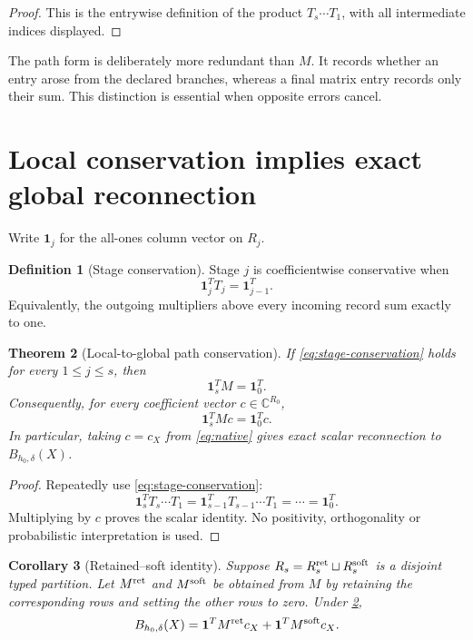 \documentclass[11pt]{article}
\newtheorem{theorem}{Theorem}[section]
\newtheorem{corollary}[theorem]{Corollary}
\theoremstyle{definition}
\newtheorem{definition}[theorem]{Definition}
\theoremstyle{remark}
\newcommand{\C}{\mathbb C}
\newcommand{\one}{\mathbf 1}
\begin{document}
\begin{proof}
This is the entrywise definition of the product
\(T_s\cdots T_1\), with all intermediate indices displayed.
\end{proof}

The path form is deliberately more redundant than \(M\).  It
records whether an entry arose from the declared branches, whereas a
final matrix entry records only their sum.  This distinction is
essential when opposite errors cancel.

\section{Local conservation implies exact global reconnection}

Write \(\one_j\) for the all-ones column vector on \(R_j\).

\begin{definition}[Stage conservation]
Stage \(j\) is coefficientwise conservative when
\begin{equation}
 \one_j^TT_j=\one_{j-1}^T.
 \label{eq:stage-conservation}
\end{equation}
Equivalently, the outgoing multipliers above every incoming record
sum exactly to one.
\end{definition}

\begin{theorem}[Local-to-global path conservation]
\label{thm:local-global}
If \eqref{eq:stage-conservation} holds for every
\(1\le j\le s\), then
\[
 \boxed{\one_s^TM=\one_0^T.}
\]
Consequently, for every coefficient vector \(c\in\C^{R_0}\),
\[
 \one_s^TMc=\one_0^Tc.
\]
In particular, taking \(c=c_X\) from \eqref{eq:native} gives exact
scalar reconnection to \(B_{h_0,\delta}(X)\).
\end{theorem}

\begin{proof}
Repeatedly use \eqref{eq:stage-conservation}:
\[
 \one_s^TT_s\cdots T_1
 =
 \one_{s-1}^TT_{s-1}\cdots T_1
 =\cdots=\one_0^T.
\]
Multiplying by \(c\) proves the scalar identity.  No positivity,
orthogonality or probabilistic interpretation is used.
\end{proof}

\begin{corollary}[Retained--soft identity]
\label{cor:retsoft}
Suppose \(R_s=R_s^{\rm ret}\sqcup R_s^{\rm soft}\) is a disjoint
typed partition.  Let \(M^{\rm ret}\) and \(M^{\rm soft}\) be obtained
from \(M\) by retaining the corresponding rows and setting the other
rows to zero.  Under \cref{thm:local-global},
\[
 B_{h_0,\delta}(X)
 =
 \one^TM^{\rm ret}c_X+\one^TM^{\rm soft}c_X.
\]
\end{corollary}
\end{document}
